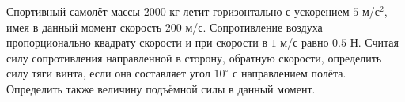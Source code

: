 Спортивный самолёт массы $2000$ кг летит горизонтально
с ускорением $5$ м/с$^2$, имея в данный момент скорость $200$ м/с.
Сопротивление воздуха пропорционально квадрату скорости
и при скорости в $1$ м/с равно $0.5$ Н.
Считая силу сопротивления направленной в сторону, обратную скорости,
определить силу тяги винта, если она составляет угол $10^{\circ}$
с направлением полёта.
Определить также величину подъёмной силы в данный момент.

